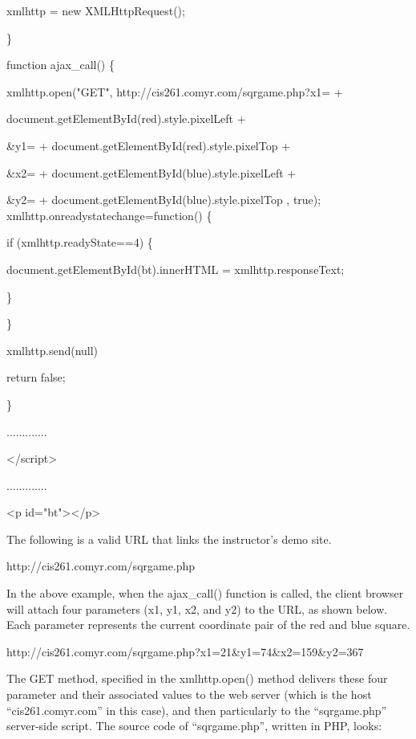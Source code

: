 \documentclass[
]{article}
\begin{document}
xmlhttp = new XMLHttpRequest();

\}

function ajax\_call() \{

xmlhttp.open("GET",
\textquotesingle http://cis261.comyr.com/sqrgame.php?x1=\textquotesingle{}
+

document.getElementById(\textquotesingle red\textquotesingle).style.pixelLeft
+

\textquotesingle\&y1=\textquotesingle{} +
document.getElementById(\textquotesingle red\textquotesingle).style.pixelTop
+

\textquotesingle\&x2=\textquotesingle{} +
document.getElementById(\textquotesingle blue\textquotesingle).style.pixelLeft
+

\textquotesingle\&y2=\textquotesingle{} +
document.getElementById(\textquotesingle blue\textquotesingle).style.pixelTop
, true); xmlhttp.onreadystatechange=function() \{

if (xmlhttp.readyState==4) \{

document.getElementById(\textquotesingle bt\textquotesingle).innerHTML =
xmlhttp.responseText;

\}

\}

xmlhttp.send(null)

return false;

\}

.............

\textless/script\textgreater{}

.............

\textless p id="bt"\textgreater\textless/p\textgreater{}

The following is a valid URL that links the instructor's demo site.

http://cis261.comyr.com/sqrgame.php

In the above example, when the ajax\_call() function is called, the
client browser will attach four parameters (x1, y1, x2, and y2) to the
URL, as shown below. Each parameter represents the current coordinate
pair of the red and blue square.

http://cis261.comyr.com/sqrgame.php?x1=21\&y1=74\&x2=159\&y2=367

The GET method, specified in the xmlhttp.open() method delivers these
four parameter and their associated values to the web server (which is
the host ``cis261.comyr.com'' in this case), and then particularly to
the ``sqrgame.php'' server-side script. The source code of
``sqrgame.php'', written in PHP, looks:
\end{document}
